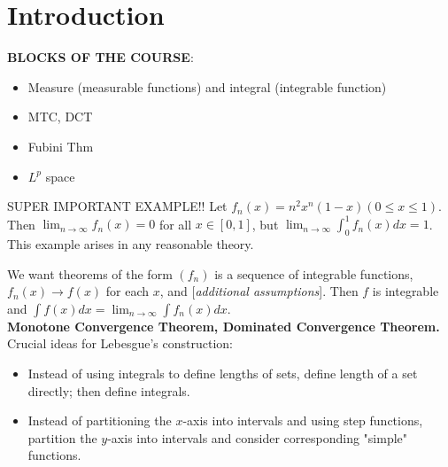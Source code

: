 \setcounter{chapter}{-1}
\chapter{Introduction}
\textbf{BLOCKS OF THE COURSE}:
\begin{itemize}
    \item Measure (measurable functions) and integral (integrable function)
    \item MTC, DCT
    \item Fubini Thm
    \item $L^{p}$ space


\end{itemize}
\begin{eg}
    SUPER IMPORTANT EXAMPLE!! Let $f_n(x) = n^2x^{n}(1-x) (0 \le x \le 1)$. Then $\lim_{n \to \infty} f_n(x) = 0$ for all $x \in  [0, 1]$, but $\lim_{n \to \infty} \int_{0}^{1} f_n(x)dx = 1$. This example arises in any reasonable theory.
\end{eg}
We want theorems of the form $(f_n)$ is a sequence of integrable functions, $f_n(x) \to  f(x) $ for each $x$, and [\textit{additional assumptions}]. Then $f$ is integrable and $\int f(x) dx = \lim_{n \to \infty} \int f_n(x) dx$. 
\\
\textbf{Monotone Convergence Theorem, Dominated Convergence Theorem.}
\\
Crucial ideas for Lebesgue's construction:
\begin{itemize}
    \item Instead of using integrals to define lengths of sets, define length of a set directly; then define integrals.
    \item Instead of partitioning the $x$-axis into intervals and using step functions, partition the $y$-axis into intervals and consider corresponding "simple" functions.
\end{itemize}
